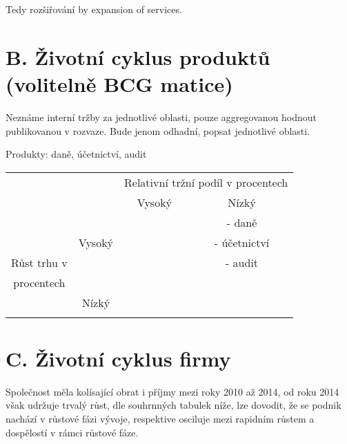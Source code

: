 Tedy rozšiřování by expansion of services. 

\newpage

\section*{B. Životní cyklus produktů (volitelně BCG matice)}
\label{sec:Zivotni cyklus produktu}

Neznáme interní tržby za jednotlivé oblasti, pouze aggregovanou hodnout publikovanou v rozvaze. Bude jenom odhadní, popsat jednotlivé oblasti.

Produkty: daně, účetnictví, audit

\begin{table}[!hbtp]
\centering
\begin{tabular}{cc|cc|}
\cline{3-4}
\multicolumn{1}{l}{} & \multicolumn{1}{l|}{} & \multicolumn{2}{c|}{Relativní tržní podíl v procentech} \\ \cline{3-4} 
\multicolumn{1}{l}{} & \multicolumn{1}{l|}{} & \multicolumn{1}{c|}{Vysoký} & Nízký \\ \hline
\multicolumn{1}{|c|}{} &  & \multicolumn{1}{c|}{\cellcolor[HTML]{67FD9A}} & - daně \\
\multicolumn{1}{|c|}{} & Vysoký & \multicolumn{1}{c|}{\cellcolor[HTML]{67FD9A}} & - účetnictví \\
\multicolumn{1}{|c|}{Růst trhu v} &  & \multicolumn{1}{c|}{\cellcolor[HTML]{67FD9A}} & - audit \\ \cline{2-4} 
\multicolumn{1}{|c|}{procentech} &  & \multicolumn{1}{c|}{} & \cellcolor[HTML]{FD6864}{\color[HTML]{000000} } \\
\multicolumn{1}{|c|}{} & Nízký & \multicolumn{1}{c|}{} & \cellcolor[HTML]{FD6864} \\
\multicolumn{1}{|c|}{} &  & \multicolumn{1}{c|}{} & \cellcolor[HTML]{FD6864} \\ \hline
\end{tabular}
\end{table}

\section*{C. Životní cyklus firmy}
\label{sec:Zivotni cyklus firmy}

Společnost měla kolísající obrat i příjmy mezi roky 2010 až 2014, od roku 2014 však udržuje trvalý růst, dle souhrnných tabulek níže, lze dovodit, že se podnik nachází v růstové fázi vývoje, respektive osciluje mezi rapidním růstem a dospělostí v rámci růstové fáze.\\

